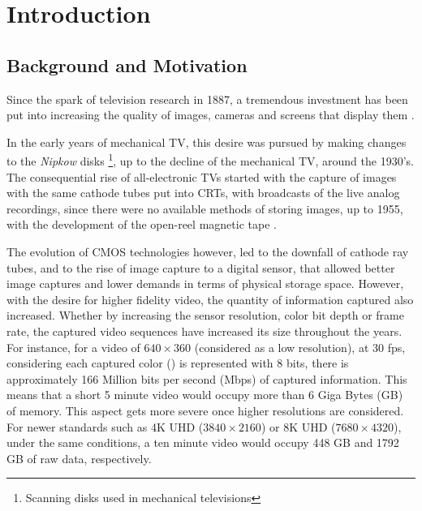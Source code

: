 \cleardoublepage
{}
\chapter{Introduction}

\section{Background and Motivation}


Since the spark of television research in 1887, a tremendous investment has been put into increasing the quality of images, cameras and screens that display them \cite{schubinWhatSparkedVideo2017}.

In the early years of mechanical \gls{TV}, this desire was pursued by making changes to the \textit{Nipkow} disks \footnote{Scanning disks used in mechanical televisions}, up to the decline of the mechanical TV, around the 1930's. The consequential rise of all-electronic TVs started with the capture of images with the same cathode tubes put into \glspl{CRT}, with broadcasts of the live analog recordings, since there were no available methods of storing images, up to 1955, with the development of the open-reel magnetic tape \cite{jacobsBriefHistoryVideo}.

The evolution of \Gls{CMOS} technologies however, led to the downfall of cathode ray tubes, and to the rise of image capture to a digital sensor, that allowed better image captures and lower demands in terms of physical storage space. However, with the desire for higher fidelity video, the quantity of information captured also increased. Whether by increasing the sensor resolution, color bit depth or frame rate, the captured video sequences have increased its size throughout the years. For instance, for a video of $640 \times 360$ (considered as a low resolution), at 30 \gls{fps}, considering each captured color () is represented with 8 bits, there is approximately 166 Million bits per second (Mbps) of captured information. This means that a short 5 minute video would occupy more than 6 Giga Bytes (GB) of memory. This aspect gets more severe once higher resolutions are considered. For newer standards such as 4K \Gls{UHD} ($3840 \times 2160$) or 8K UHD ($ 7680 \times 4320$), under the same conditions, a ten minute video would occupy 448 GB and 1792 GB of raw data, respectively.

